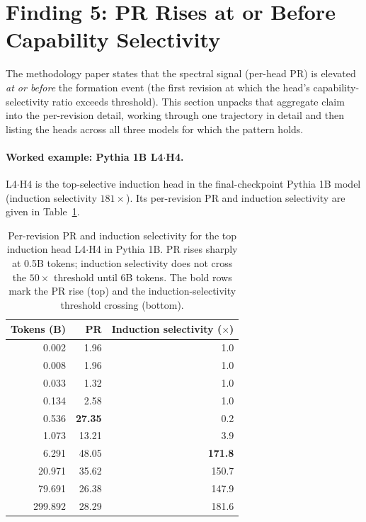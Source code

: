\documentclass[11pt]{article}
\begin{document}
\section{Finding 5: PR Rises at or Before Capability Selectivity}
\label{sec:f5}

The methodology paper \citep{paper1_methodology} states that the spectral
signal (per-head PR) is elevated \emph{at or before} the formation event
(the first revision at which the head's capability-selectivity ratio
exceeds threshold). This section unpacks that aggregate claim into the
per-revision detail, working through one trajectory in detail and then
listing the heads across all three models for which the pattern holds.

\paragraph{Worked example: Pythia 1B L4$\cdot$H4.} L4$\cdot$H4 is the
top-selective induction head in the final-checkpoint Pythia 1B model
(induction selectivity $181\times$). Its per-revision PR and induction
selectivity are given in Table~\ref{tab:l4h4}.

\begin{table}[t]
\centering
\caption{Per-revision PR and induction selectivity for the top induction
head L4$\cdot$H4 in Pythia 1B. PR rises sharply at 0.5B tokens; induction
selectivity does not cross the $50\times$ threshold until 6B tokens.
The bold rows mark the PR rise (top) and the induction-selectivity
threshold crossing (bottom).}
\label{tab:l4h4}
\small
\begin{tabular}{r r r}
\toprule
Tokens (B) & PR & Induction selectivity ($\times$) \\
\midrule
0.002 & 1.96  & 1.0   \\
0.008 & 1.96  & 1.0   \\
0.033 & 1.32  & 1.0   \\
0.134 & 2.58  & 1.0   \\
0.536 & \textbf{27.35} & 0.2   \\
1.073 & 13.21 & 3.9   \\
6.291 & 48.05 & \textbf{171.8} \\
20.971& 35.62 & 150.7 \\
79.691& 26.38 & 147.9 \\
299.892& 28.29 & 181.6 \\
\bottomrule
\end{tabular}
\end{table}
\end{document}
